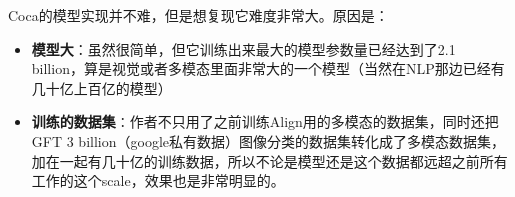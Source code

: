 \documentclass[zihao=false,fontset=windows]{ctexart}
\begin{document}
Coca的模型实现并不难，但是想复现它难度非常大。原因是：\par
\begin{itemize}
\item \textbf{模型大}：\textcolor{feishuGreen}{虽然很简单，但它训练出来最大的模型参数量已经达到了2.1 billion，算是视觉或者多模态里面非常大的一个模型（当然在NLP那边已经有几十亿上百亿的模型）}
\item \textbf{训练的数据集}{\symbolfont ∶}\textcolor{feishuGreen}{作者不只用了之前训练Align用的多模态的数据集，同时还把GFT 3 billion（google私有数据）图像分类的数据集转化成了多模态数据集，加在一起有几十亿的训练数据，所以不论是模型还是这个数据都远超之前所有工作的这个scale，效果也是非常明显的。}
\end{itemize}
\end{document}
